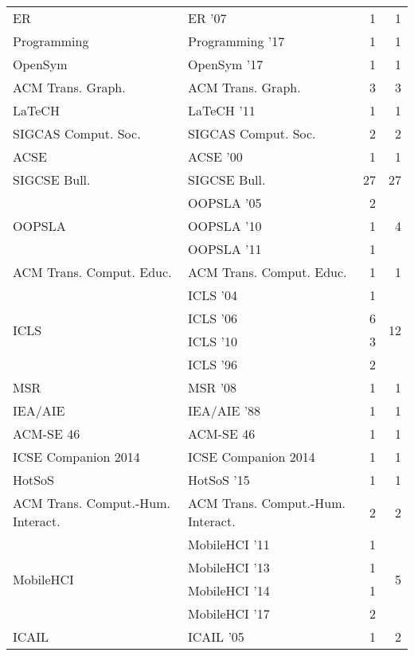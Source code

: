 \begin{table*}[t]
\begin{tabular}{llrr}
\multirow{1}{*}{ER } & ER '07 & 1 & \multirow{1}{*}{1}\\
\multirow{1}{*}{Programming } & Programming '17 & 1 & \multirow{1}{*}{1}\\
\multirow{1}{*}{OpenSym } & OpenSym '17 & 1 & \multirow{1}{*}{1}\\
\multirow{1}{*}{ACM Trans. Graph.} & ACM Trans. Graph. & 3 & \multirow{1}{*}{3}\\
\multirow{1}{*}{LaTeCH } & LaTeCH '11 & 1 & \multirow{1}{*}{1}\\
\multirow{1}{*}{SIGCAS Comput. Soc.} & SIGCAS Comput. Soc. & 2 & \multirow{1}{*}{2}\\
\multirow{1}{*}{ACSE } & ACSE '00 & 1 & \multirow{1}{*}{1}\\
\multirow{1}{*}{SIGCSE Bull.} & SIGCSE Bull. & 27 & \multirow{1}{*}{27}\\
\multirow{3}{*}{OOPSLA } & OOPSLA '05 & 2 & \multirow{3}{*}{4}\\
& OOPSLA '10 & 1 &\\
& OOPSLA '11 & 1 &\\
\multirow{1}{*}{ACM Trans. Comput. Educ.} & ACM Trans. Comput. Educ. & 1 & \multirow{1}{*}{1}\\
\multirow{4}{*}{ICLS } & ICLS '04 & 1 & \multirow{4}{*}{12}\\
& ICLS '06 & 6 &\\
& ICLS '10 & 3 &\\
& ICLS '96 & 2 &\\
\multirow{1}{*}{MSR } & MSR '08 & 1 & \multirow{1}{*}{1}\\
\multirow{1}{*}{IEA/AIE } & IEA/AIE '88 & 1 & \multirow{1}{*}{1}\\
\multirow{1}{*}{ACM-SE 46} & ACM-SE 46 & 1 & \multirow{1}{*}{1}\\
\multirow{1}{*}{ICSE Companion 2014} & ICSE Companion 2014 & 1 & \multirow{1}{*}{1}\\
\multirow{1}{*}{HotSoS } & HotSoS '15 & 1 & \multirow{1}{*}{1}\\
\multirow{1}{*}{ACM Trans. Comput.-Hum. Interact.} & ACM Trans. Comput.-Hum. Interact. & 2 & \multirow{1}{*}{2}\\
\multirow{4}{*}{MobileHCI } & MobileHCI '11 & 1 & \multirow{4}{*}{5}\\
& MobileHCI '13 & 1 &\\
& MobileHCI '14 & 1 &\\
& MobileHCI '17 & 2 &\\
\multirow{2}{*}{ICAIL } & ICAIL '05 & 1 & \multirow{2}{*}{2}\\

\end{tabular}
\end{table*}
